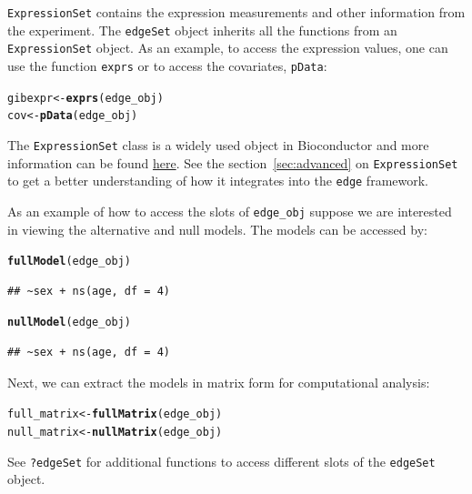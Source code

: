 \documentclass{article}\usepackage[]{graphicx}\usepackage[]{color}
\makeatletter
\newcommand{\hlstd}[1]{\textcolor[rgb]{0.345,0.345,0.345}{#1}}%
\newcommand{\hlkwb}[1]{\textcolor[rgb]{0.69,0.353,0.396}{#1}}%
\newcommand{\hlkwd}[1]{\textcolor[rgb]{0.737,0.353,0.396}{\textbf{#1}}}%
\newenvironment{kframe}{%
 \def\at@end@of@kframe{}%
 \ifinner\ifhmode%
  \def\at@end@of@kframe{\end{minipage}}%
  \begin{minipage}{\columnwidth}%
 \fi\fi%
 \def\FrameCommand##1{\hskip\@totalleftmargin \hskip-\fboxsep
 \colorbox{shadecolor}{##1}\hskip-\fboxsep
     \hskip-\linewidth \hskip-\@totalleftmargin \hskip\columnwidth}%
 \MakeFramed {\advance\hsize-\width
   \@totalleftmargin\z@ \linewidth\hsize
   \@setminipage}}%
 {\par\unskip\endMakeFramed%
 \at@end@of@kframe}
\newenvironment{knitrout}{}{} %
\makeatother
\begin{document}
{\tt ExpressionSet} contains the expression measurements and other information from the experiment. The {\tt edgeSet} object inherits all the functions from an {\tt ExpressionSet} object. As an example, to access the expression values, one can use the function {\tt exprs} or to access the covariates, {\tt pData}:
\begin{knitrout}
\color{fgcolor}\begin{kframe}
\begin{alltt}
\hlstd{gibexpr} \hlkwb{<-} \hlkwd{exprs}\hlstd{(edge_obj)}
\hlstd{cov} \hlkwb{<-} \hlkwd{pData}\hlstd{(edge_obj)}
\end{alltt}
\end{kframe}
\end{knitrout}
The {\tt ExpressionSet} class is a widely used object in Bioconductor and more information can be found \href{http://www.bioconductor.org/packages/2.14/bioc/html/Biobase.html}{here}. See the section~\ref{sec:advanced} on {\tt ExpressionSet} to get a better understanding of how it integrates into the {\tt edge} framework.

As an example of how to access the slots of {\tt edge\_obj} suppose we are interested in viewing the alternative and null models. The models can be accessed by:
\begin{knitrout}
\color{fgcolor}\begin{kframe}
\begin{alltt}
\hlkwd{fullModel}\hlstd{(edge_obj)}
\end{alltt}
\begin{verbatim}
## ~sex + ns(age, df = 4)
\end{verbatim}
\begin{alltt}
\hlkwd{nullModel}\hlstd{(edge_obj)}
\end{alltt}
\begin{verbatim}
## ~sex + ns(age, df = 4)
\end{verbatim}
\end{kframe}
\end{knitrout}
Next, we can extract the models in matrix form for computational analysis:
\begin{knitrout}
\color{fgcolor}\begin{kframe}
\begin{alltt}
\hlstd{full_matrix} \hlkwb{<-} \hlkwd{fullMatrix}\hlstd{(edge_obj)}
\hlstd{null_matrix} \hlkwb{<-} \hlkwd{nullMatrix}\hlstd{(edge_obj)}
\end{alltt}
\end{kframe}
\end{knitrout}
See {\tt ?edgeSet} for additional functions to access different slots of the {\tt edgeSet} object. 
\end{document}

